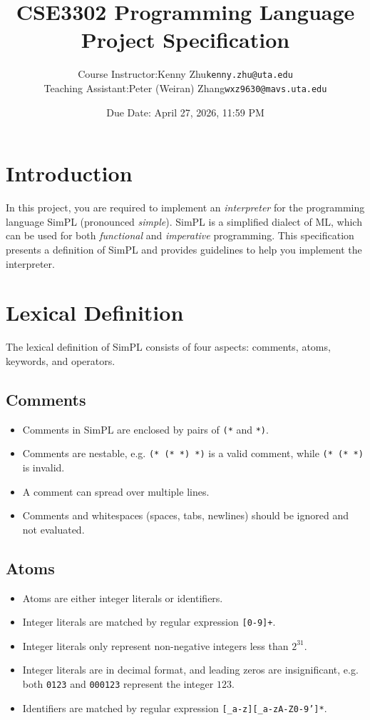 \documentclass{article}
\title{
  \textbf{CSE3302 Programming Language Project Specification} \\
  }
\author{
  \normalsize
  \begin{tabular}{rcl}
    Course Instructor: & Kenny Zhu & \texttt{kenny.zhu@uta.edu} \\
    Teaching Assistant: & Peter (Weiran) Zhang & \texttt{wxz9630@mavs.uta.edu} \\
  \end{tabular}
}
\date{Due Date: April 27, 2026, 11:59 PM}
\begin{document}
\maketitle

\section{Introduction}

In this project, you are required to implement an \emph{interpreter} for the
programming language SimPL (pronounced \emph{simple}).  SimPL is a simplified
dialect of ML, which can be used for both \emph{functional} and
\emph{imperative} programming.  This specification presents a definition of
SimPL and provides guidelines to help you implement the interpreter.

\section{Lexical Definition}

The lexical definition of SimPL consists of four aspects: comments, atoms, keywords, and operators.

\subsection{Comments}

\begin{itemize}
  \item Comments in SimPL are enclosed by pairs of \texttt{(*} and \texttt{*)}.
  \item Comments are nestable, e.g. \texttt{(*  (*  *)  *)} is a valid comment, while \texttt{(*  (*  *)} is invalid.
  \item A comment can spread over multiple lines.
  \item Comments and whitespaces (spaces, tabs, newlines) should be ignored and not evaluated.
\end{itemize}

\subsection{Atoms}

\begin{itemize}
  \item Atoms are either integer literals or identifiers.
  \item Integer literals are matched by regular expression \texttt{[0-9]+}.
  \item Integer literals only represent non-negative integers less than $2^{31}$.
  \item Integer literals are in decimal format, and leading zeros are insignificant, e.g. both \texttt{0123} and \texttt{000123} represent the integer $123$.
  \item Identifiers are matched by regular expression \texttt{[\_a-z][\_a-zA-Z0-9']*}.
\end{itemize}
\end{document}
